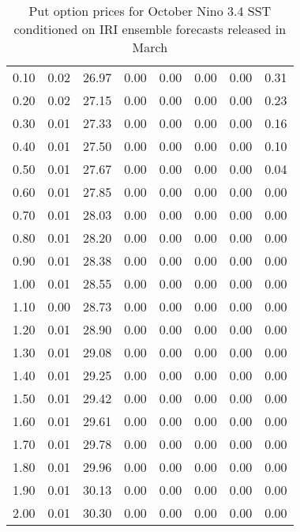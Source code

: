 \begin{table*}[ht]
\begin{tabular}{rrrrrrrr}
  0.10 & 0.02 & 26.97 & 0.00 & 0.00 & 0.00 & 0.00 & 0.31 \\ 
  0.20 & 0.02 & 27.15 & 0.00 & 0.00 & 0.00 & 0.00 & 0.23 \\ 
  0.30 & 0.01 & 27.33 & 0.00 & 0.00 & 0.00 & 0.00 & 0.16 \\ 
  0.40 & 0.01 & 27.50 & 0.00 & 0.00 & 0.00 & 0.00 & 0.10 \\ 
  0.50 & 0.01 & 27.67 & 0.00 & 0.00 & 0.00 & 0.00 & 0.04 \\ 
  0.60 & 0.01 & 27.85 & 0.00 & 0.00 & 0.00 & 0.00 & 0.00 \\ 
  0.70 & 0.01 & 28.03 & 0.00 & 0.00 & 0.00 & 0.00 & 0.00 \\ 
  0.80 & 0.01 & 28.20 & 0.00 & 0.00 & 0.00 & 0.00 & 0.00 \\ 
  0.90 & 0.01 & 28.38 & 0.00 & 0.00 & 0.00 & 0.00 & 0.00 \\ 
  1.00 & 0.01 & 28.55 & 0.00 & 0.00 & 0.00 & 0.00 & 0.00 \\ 
  1.10 & 0.00 & 28.73 & 0.00 & 0.00 & 0.00 & 0.00 & 0.00 \\ 
  1.20 & 0.01 & 28.90 & 0.00 & 0.00 & 0.00 & 0.00 & 0.00 \\ 
  1.30 & 0.01 & 29.08 & 0.00 & 0.00 & 0.00 & 0.00 & 0.00 \\ 
  1.40 & 0.01 & 29.25 & 0.00 & 0.00 & 0.00 & 0.00 & 0.00 \\ 
  1.50 & 0.01 & 29.42 & 0.00 & 0.00 & 0.00 & 0.00 & 0.00 \\ 
  1.60 & 0.01 & 29.61 & 0.00 & 0.00 & 0.00 & 0.00 & 0.00 \\ 
  1.70 & 0.01 & 29.78 & 0.00 & 0.00 & 0.00 & 0.00 & 0.00 \\ 
  1.80 & 0.01 & 29.96 & 0.00 & 0.00 & 0.00 & 0.00 & 0.00 \\ 
  1.90 & 0.01 & 30.13 & 0.00 & 0.00 & 0.00 & 0.00 & 0.00 \\ 
  2.00 & 0.01 & 30.30 & 0.00 & 0.00 & 0.00 & 0.00 & 0.00 \\ 
   \hline
\end{tabular}
\caption{Put option prices for October Nino 3.4 SST conditioned on IRI ensemble forecasts released in March} 
\end{table*}

